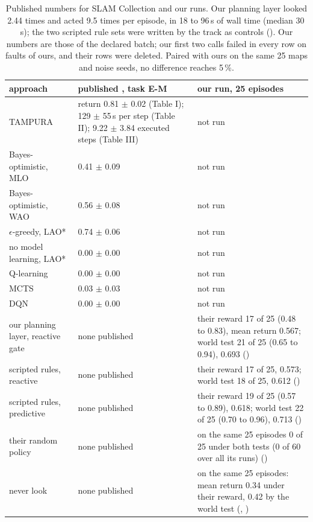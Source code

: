 \begin{table}[tbp]
\centering
\small
\begin{tabularx}{\textwidth}{@{}P{3.6cm}YY@{}}
\toprule
approach & published \cite{curtis2024partially}, task E-M & our run, 25 episodes \\
\midrule
TAMPURA & return 0.81 $\pm$ 0.02 (Table I); 129 $\pm$ 55\,s per step (Table II); 9.22 $\pm$ 3.84 executed steps (Table III) & not run \\
Bayes-optimistic, MLO & 0.41 $\pm$ 0.09 & not run \\
Bayes-optimistic, WAO & 0.56 $\pm$ 0.08 & not run \\
$\epsilon$-greedy, LAO* & 0.74 $\pm$ 0.06 & not run \\
no model learning, LAO* & 0.00 $\pm$ 0.00 & not run \\
Q-learning & 0.00 $\pm$ 0.00 & not run \\
MCTS & 0.03 $\pm$ 0.03 & not run \\
DQN & 0.00 $\pm$ 0.00 & not run \\
\midrule
our planning layer, reactive gate &
none published &
their reward 17 of 25 (0.48 to 0.83), mean return 0.567; world test 21 of 25
(0.65 to 0.94), 0.693 () \\
scripted rules, reactive &
none published &
their reward 17 of 25, 0.573; world test 18 of 25, 0.612 () \\
scripted rules, predictive &
none published &
their reward 19 of 25 (0.57 to 0.89), 0.618; world test 22 of 25 (0.70 to 0.96),
0.713 () \\
their random policy &
none published &
on the same 25 episodes 0 of 25 under both tests (0 of 60 over all its runs) () \\
never look &
none published &
on the same 25 episodes: mean return 0.34 under their reward, 0.42 by the world test
(, ) \\
\bottomrule
\end{tabularx}
\caption[Published numbers for SLAM Collection and our runs.]{Published numbers for
SLAM Collection and our runs. Our planning layer
looked 2.44 times and acted 9.5 times per episode, in 18 to 96\,s of wall time
(median 30\,s); the two scripted rule sets were written by the track as controls
(). Our numbers are those of the declared batch; our first two calls failed in
every row on faults of ours, and their rows were deleted. Paired with ours on the same
25 maps and noise seeds, no difference reaches 5\,\%.}
\label{tab:published-sl}
\end{table}

